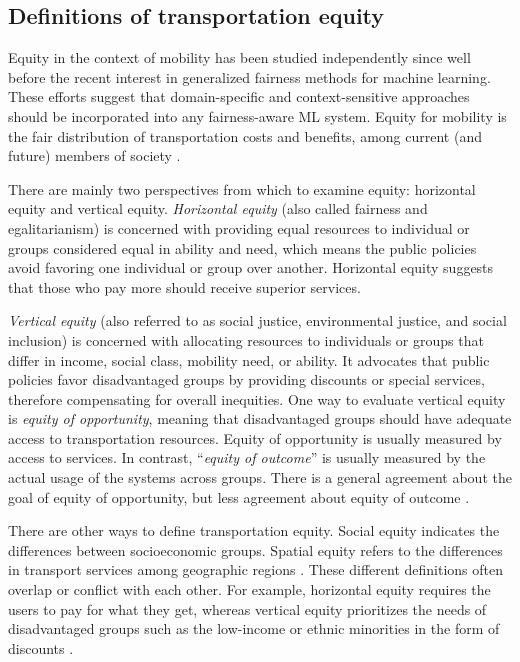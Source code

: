 \documentclass[11pt]{article}
\begin{document}
\subsection{Definitions of transportation equity}
Equity in the context of mobility has been studied independently since well before the recent interest in generalized fairness methods for machine learning.  These efforts suggest that domain-specific and context-sensitive approaches should be incorporated into any fairness-aware ML system.  Equity for mobility is the fair distribution of transportation costs and benefits, among current (and future) members of society \cite{litman2018evaluating}. 

There are mainly two perspectives from which to examine equity: horizontal equity and vertical equity. \textit{Horizontal equity} (also called fairness and egalitarianism) is concerned with providing equal resources to individual or groups considered equal in ability and need, which means the public policies avoid favoring one individual or group over another. Horizontal equity suggests that those who pay more should receive superior services. 

\textit{Vertical equity} (also referred to as social justice, environmental justice, and social inclusion) is concerned with allocating resources to individuals or groups that differ in income, social class, mobility need, or ability.  It advocates that public policies favor disadvantaged groups by providing discounts or special services, therefore compensating for overall inequities. One way to evaluate vertical equity is \textit{equity of opportunity}, meaning that disadvantaged groups should have adequate access to transportation resources. Equity of opportunity is usually measured by access to services. In contrast, “\textit{equity of outcome}” is usually measured by the actual usage of the systems across groups. There is a general agreement about the goal of equity of opportunity, but less agreement about equity of outcome \cite{litman2018evaluating, delbosc2011using,lucas2016method}. 

There are other ways to define transportation equity. Social equity indicates the differences between socioeconomic groups. Spatial equity refers to the differences in transport services among geographic regions \cite{feng2014trade}. These different definitions often overlap or conflict with each other. For example, horizontal equity requires the users to pay for what they get, whereas vertical equity prioritizes the needs of disadvantaged groups such as the low-income or ethnic minorities in the form of discounts \cite{thomopoulos2009incorporating}.
\end{document}
